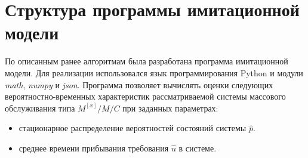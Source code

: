 \documentclass[bachelor, och, pract, times]{SCWorks}
\begin{document}
\section{Структура программы имитационной модели}

По описанным ранее алгоритмам была разработана программа имитационной модели. Для реализации использовался язык программирования Python и модули \textit{math}, \textit{numpy} и \textit{json}. Программа позволяет вычислять оценки следующих вероятностно-временных характеристик рассматриваемой системы массового обслуживания типа $M^{[x]}/M/C$ при заданных параметрах:
\begin{itemize}
    \item стационарное распределение вероятностей состояний системы $\hat{p}$.
    \item среднее времени прибывания требования $\hat{u}$ в системе.
\end{itemize}
\end{document}
